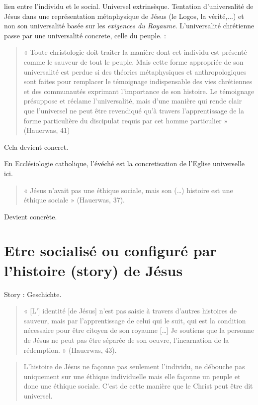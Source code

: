   lien entre l'individu et le social. Universel extrinsèque. Tentation d'universalité de Jésus dans une représentation métaphysique de Jésus (le Logos, la vérité,...) et non son universalité basée sur les \textit{exigences du Royaume}.
L'universalité chrétienne passe par une universalité concrete, celle du peuple. : 
\begin{quote}
    « Toute christologie doit traiter la manière dont cet individu est présenté comme le sauveur de tout le
peuple. Mais cette forme appropriée de son universalité est perdue si des théories métaphysiques et
anthropologiques sont faites pour remplacer le témoignage indispensable des vies chrétiennes et des
communautés exprimant l’importance de son histoire. Le témoignage présuppose et réclame
l’universalité, mais d’une manière qui rende clair que l’universel ne peut être revendiqué qu’à travers
l’apprentissage de la forme particulière du discipulat requis par cet homme particulier » (Hauerwas,
41)
\end{quote}


  \begin{Prop}
  Cela devient concret.
  \end{Prop}
\begin{Ex}
 En Ecclésiologie catholique, l'évéché est la concretisation de l'Eglise universelle ici.
\end{Ex}


 \begin{quote}
     « Jésus n’avait pas une éthique sociale, mais son (…) histoire est une éthique sociale » (Hauerwas,
37).
 \end{quote}
Devient concrète. 
 
\section{Etre socialisé ou configuré par l’histoire (story) de Jésus} 

Story : Geschichte.
\begin{quote}
    « [L’] identité [de Jésus] n’est pas saisie à travers d’autres histoires de sauveur, mais par
l’apprentissage de celui qui le suit, qui est la condition nécessaire pour être citoyen de son
royaume […] Je soutiens que la personne de Jésus ne peut pas être séparée de son oeuvre, l’incarnation
de la rédemption. » (Hauerwas, 43).
\end{quote}


\begin{quote}
L’histoire de Jésus ne façonne pas seulement l’individu, ne débouche pas uniquement sur une éthique
individuelle mais elle façonne un peuple et donc une éthique sociale. C’est de cette manière que le
Christ peut être dit universel.
    
\end{quote}

